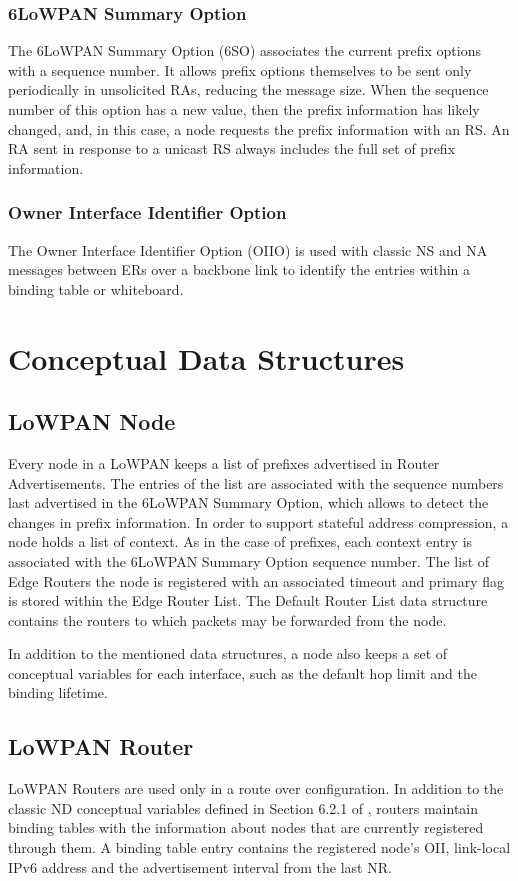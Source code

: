 \subsubsection{6LoWPAN Summary Option}\label{nd.option.summary}
The 6LoWPAN Summary Option (6SO) associates the current prefix options with a sequence number. It allows prefix options themselves to be sent only periodically in unsolicited RAs, reducing the message size. When the sequence number of this option has a new value, then the prefix information has likely changed, and, in this case, a node requests the prefix information with an RS. An RA sent in response to a unicast RS always includes the full set of prefix information.

\subsubsection{Owner Interface Identifier Option}\label{sec:nd.oiio}
The Owner Interface Identifier Option (OIIO) is used with classic NS and NA messages between ERs over a backbone link to identify the entries within a binding table or whiteboard.

\section{Conceptual Data Structures }
\subsection{LoWPAN Node}
Every node in a LoWPAN keeps a list of prefixes advertised in Router Advertisements. The entries of the list are associated with the sequence numbers last advertised in the 6LoWPAN Summary Option, which allows to detect the changes in prefix information. In order to support stateful address compression, a node holds a list of context. As in the case of prefixes, each context entry is associated with the 6LoWPAN Summary Option sequence number. The list of Edge Routers the node is registered with an associated timeout and primary flag is stored within the Edge Router List. 
The Default Router List data structure contains the routers to which packets may be forwarded from the node. 

In addition to the mentioned data structures, a node also keeps a set of conceptual variables for each interface, such as the default hop limit and the binding lifetime.

\subsection{LoWPAN Router}
LoWPAN Routers are used only in a route over configuration. In addition to the classic ND conceptual variables defined in Section 6.2.1 of \cite{rfc4861}, routers maintain binding tables with the information about nodes that are currently registered through them. A binding table entry  contains the registered node's OII, link-local IPv6 address and the advertisement interval from the last NR.

